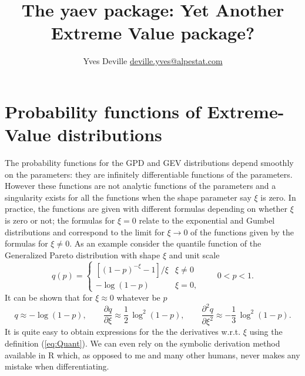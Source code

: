 \documentclass[11pt]{article}\usepackage[]{graphicx}\usepackage[]{xcolor}
\title{The \textbf{yaev} package: Yet Another Extreme Value package?}
\author{Yves Deville \href{mailto:deville.yves@alpestat.com}%
  {deville.yves@alpestat.com} }
\begin{document}
\maketitle{}
\tableofcontents{}

\section{Probability functions of Extreme-Value distributions}
  
The probability functions for the GPD and GEV distributions depend
smoothly on the parameters: they are infinitely differentiable
functions of the parameters. However these functions are not analytic
functions of the parameters and a singularity exists for all the
functions when the shape parameter say $\xi$ is zero.  In practice,
the functions are given with different formulas depending on whether
$\xi$ is zero or not; the formulas for $\xi = 0$ relate to the
exponential and Gumbel distributions and correspond to the limit for
$\xi \to 0$ of the functions given by the formulas for $\xi \neq 0$.
As an example consider the quantile function of the Generalized Pareto
distribution with shape $\xi$ and unit scale
\begin{equation}
\label{eq:Quant}
q(p) = \begin{cases}
  [(1 - p)^{-\xi} - 1] / \xi & \xi \neq 0 \\
  -\log(1 - p) & \xi = 0,
\end{cases} \qquad 0 < p < 1.
\end{equation}
It can be shown that for $\xi \approx 0$ whatever be $p$
$$
q \approx - \log(1-p), \qquad
\frac{\partial q}{\partial \xi} \approx \frac{1}{2}\, \log^2(1-p), \qquad
\frac{\partial^2 q}{\partial \xi^2} \approx -\frac{1}{3}\, \log^2(1-p).
$$
It is quite easy to obtain expressions for the the derivatives
w.r.t. $\xi$ using the definition (\ref{eq:Quant}). We can even rely
on the symbolic derivation method \verb@D@ available in R which, as
opposed to me and many other humans, never makes any mistake when
differentiating.
\end{document}
